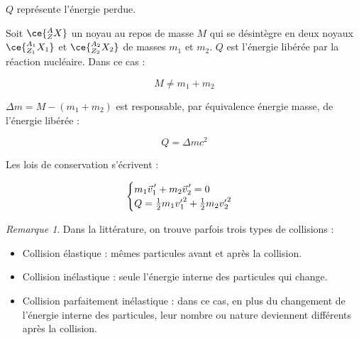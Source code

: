 \documentclass[12pt,a4paper,oneside,french]{book}
\newcommand{\pvec}[1]{\vec{#1} \mkern2mu \vphantom{#1}}
\theoremstyle{definition}
\theoremstyle{definition}
\theoremstyle{definition}
\theoremstyle{remark}
\newtheorem*{remark}{Remarque}
\theoremstyle{definition}
\begin{document}
    $Q$ représente l'énergie perdue.
    
    Soit $\ce{^{A}_{Z}X}$ un noyau au repos de masse $M$ qui se désintègre en deux noyaux $\ce{^{{A}_{1}}_{{Z}_{1}}{X}_{1}}$ et $\ce{^{{A}_{2}}_{{Z}_{2}}{X}_{2}}$ de masses ${m}_{1}$ et ${m}_{2}$. $Q$ est l'énergie libérée par la réaction nucléaire. Dans ce cas :
    
    \begin{equation*}
        M \neq {m}_{1} + {m}_{2}
    \end{equation*}
    
    $\Delta m = M - \left({m}_{1} + {m}_{2}\right)$ est responsable, par équivalence énergie masse, de l'énergie libérée :
    
    \begin{equation*}
        Q = \Delta m {c}^{2}
    \end{equation*}
    
    Les lois de conservation s'écrivent :
    
    \begin{equation*}
    \begin{cases}
        {m}_{1} {\pvec{v}}_{\! 1}' + {m}_{2} {\pvec{v}}_{\! 2}' = 0 \\
        Q = \frac{1}{2} {m}_{1} {v'}_{\!\! 1}^{2} + \frac{1}{2} {m}_{2} {v'}_{\!\! 2}^{2}
    \end{cases}
    \end{equation*}
    
    \bigskip
    
    \begin{remark}
        Dans la littérature, on trouve parfois trois types de collisions :
        
        \leavevmode
        
        \begin{itemize}
            \itemsep0.5em
            
            \item 
            Collision élastique : mêmes particules avant et après la collision.
            
            \item
            Collision inélastique : seule l'énergie interne des particules qui change.
            
            \item
            Collision parfaitement inélastique : dans ce cas, en plus du changement de l'énergie interne des particules, leur nombre ou nature deviennent différents après la collision.
        \end{itemize}
    \end{remark}
    
\end{document}
